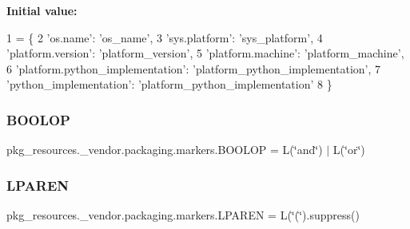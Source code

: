 {\bfseries Initial value\+:}
\begin{DoxyCode}
1 =  \{
2     \textcolor{stringliteral}{'os.name'}: \textcolor{stringliteral}{'os\_name'},
3     \textcolor{stringliteral}{'sys.platform'}: \textcolor{stringliteral}{'sys\_platform'},
4     \textcolor{stringliteral}{'platform.version'}: \textcolor{stringliteral}{'platform\_version'},
5     \textcolor{stringliteral}{'platform.machine'}: \textcolor{stringliteral}{'platform\_machine'},
6     \textcolor{stringliteral}{'platform.python\_implementation'}: \textcolor{stringliteral}{'platform\_python\_implementation'},
7     \textcolor{stringliteral}{'python\_implementation'}: \textcolor{stringliteral}{'platform\_python\_implementation'}
8 \}
\end{DoxyCode}
\mbox{\label{namespacepkg__resources_1_1__vendor_1_1packaging_1_1markers_a9098646f0518fce97c7395c87d0fcb1c}} 
\subsubsection{\texorpdfstring{B\+O\+O\+L\+OP}{BOOLOP}}
{\footnotesize\ttfamily pkg\+\_\+resources.\+\_\+vendor.\+packaging.\+markers.\+B\+O\+O\+L\+OP = L(\char`\"{}and\char`\"{}) $\vert$ L(\char`\"{}or\char`\"{})}

\mbox{\label{namespacepkg__resources_1_1__vendor_1_1packaging_1_1markers_ace0085073afe1a57ec624d43e5b78e21}} 
\subsubsection{\texorpdfstring{L\+P\+A\+R\+EN}{LPAREN}}
{\footnotesize\ttfamily pkg\+\_\+resources.\+\_\+vendor.\+packaging.\+markers.\+L\+P\+A\+R\+EN = L(\char`\"{}(\char`\"{}).suppress()}

